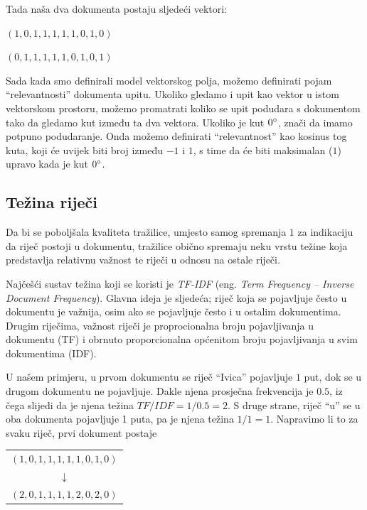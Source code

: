 \documentclass[a4paper,twoside,12pt]{scrreprt}
\newenvironment{nscenter}
 {\par\nopagebreak\centering}
 {\parskip=0pt\par\noindent\ignorespacesafterend}
\begin{document}
Tada naša dva dokumenta postaju sljedeći vektori:

\begin{compactenum}
  \item $(1,0,1,1,1,1,1,0,1,0)$
  \item $(0,1,1,1,1,1,0,1,0,1)$
\end{compactenum}

Sada kada smo definirali model vektorskog polja, možemo definirati pojam ``relevantnosti'' dokumenta upitu. Ukoliko gledamo i upit kao vektor u istom vektorskom prostoru, možemo promatrati koliko se upit podudara s dokumentom tako da gledamo kut između ta dva vektora. Ukoliko je kut $0\degree$, znači da imamo potpuno podudaranje. Onda možemo definirati ``relevantnost'' kao kosinus tog kuta, koji će uvijek biti broj između $-1$ i $1$, s time da će biti maksimalan ($1$) upravo kada je kut $0\degree$.

\subsection{Težina riječi}
\label{tfidf}

Da bi se poboljšala kvaliteta tražilice, umjesto samog spremanja $1$ za indikaciju da riječ postoji u dokumentu, tražilice obično spremaju neku vrstu težine koja predstavlja relativnu važnost te riječi u odnosu na ostale riječi.

Najčešći sustav težina koji se koristi je \textit{TF-IDF} (eng. \textit{Term Frequency – Inverse Document Frequency}). Glavna ideja je sljedeća; riječ koja se pojavljuje često u dokumentu je važnija, osim ako se pojavljuje često i u ostalim dokumentima. Drugim riječima, važnost riječi je proprocionalna broju pojavljivanja u dokumentu (TF) i obrnuto proporcionalna općenitom broju pojavljivanja u svim dokumentima (IDF).

U našem primjeru, u prvom dokumentu se riječ ``Ivica'' pojavljuje $1$ put, dok se u drugom dokumentu ne pojavljuje. Dakle njena prosječna frekvencija je $0.5$, iz čega slijedi da je njena težina $TF / IDF = 1 / 0.5 = 2$. S druge strane, riječ ``u'' se u oba dokumenta pojavljuje 1 puta, pa je njena težina $1 / 1 = 1$. Napravimo li to za svaku riječ, prvi dokument postaje

\begin{nscenter}
  \begin{tabular}{c}
    $(1,0,1,1,1,1,1,0,1,0)$ \\
    $\downarrow$            \\
    $(2,0,1,1,1,1,2,0,2,0)$ \\
  \end{tabular}
\end{nscenter}
\end{document}
